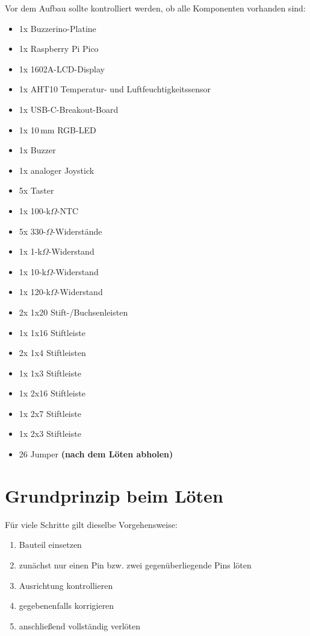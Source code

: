 \documentclass[a4paper,11pt]{article}
\begin{document}
Vor dem Aufbau sollte kontrolliert werden, ob alle Komponenten vorhanden sind:

\begin{itemize}
    \item 1x Buzzerino-Platine
    \item 1x Raspberry Pi Pico
    \item 1x 1602A-LCD-Display
    \item 1x AHT10 Temperatur- und Luftfeuchtigkeitssensor
    \item 1x USB-C-Breakout-Board
    \item 1x 10\,mm RGB-LED
    \item 1x Buzzer
    \item 1x analoger Joystick
    \item 5x Taster
    \item 1x 100-k$\Omega$-NTC
    \item 5x 330-$\Omega$-Widerstände
    \item 1x 1-k$\Omega$-Widerstand
    \item 1x 10-k$\Omega$-Widerstand
    \item 1x 120-k$\Omega$-Widerstand
    \item 2x 1x20 Stift-/Buchsenleisten
    \item 1x 1x16 Stiftleiste
    \item 2x 1x4 Stiftleisten
    \item 1x 1x3 Stiftleiste
    \item 1x 2x16 Stiftleiste
    \item 1x 2x7 Stiftleiste
    \item 1x 2x3 Stiftleiste
    \item 26 Jumper \textbf{(nach dem Löten abholen)}
\end{itemize}

\section*{Grundprinzip beim Löten}

Für viele Schritte gilt dieselbe Vorgehensweise:
\begin{enumerate}
    \item Bauteil einsetzen
    \item zunächst nur einen Pin bzw. zwei gegenüberliegende Pins löten
    \item Ausrichtung kontrollieren
    \item gegebenenfalls korrigieren
    \item anschließend vollständig verlöten
\end{enumerate}
\end{document}
